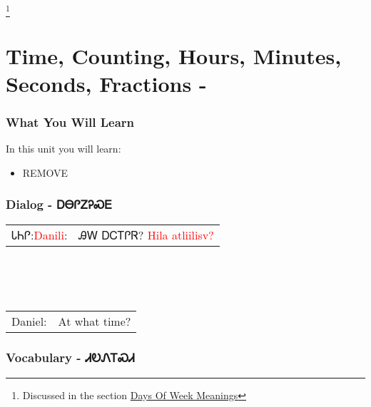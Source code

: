 \footnote{Discussed in the section \hyperref[sec:daysOfWeekMeaning]{Days Of Week Meanings}}
\index{}
\chapter{Time, Counting, Hours, Minutes, Seconds, Fractions - }
\subsection{What You Will Learn}
In this unit you will learn:
\begin{itemize}
\item REMOVE
\end{itemize}\newpage

\newpage\subsection{Dialog - ᎠᎾᎵᏃᎮᏍᎬ}
\begin{tabular}{p{2cm} p{11cm}}
ᏓᏂᎵ:\newline \textcolor{red}{Danili}: & ᎯᎳ ᎠᏟᎢᎵᏒ? 
\newline\textcolor{red}{Hila atliilisv?}\\
\end{tabular}
\\
\\
\\
\noindent\begin{tabular}{p{2cm} p{11cm}}Daniel: & At what time?\\
\end{tabular}
\vfill\newpage\subsection{Vocabulary - ᏗᎧᏁᎢᏍᏗ 
}
